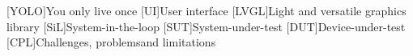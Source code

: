 \documentclass[Proposal,BIC,english,IEEE]{BASE/twbook} %
\begin{document}
\chapter*{\listacroname}
\begin{acronym}[XXXXX]
    [YOLO]{You only live once}
    [UI]{User interface}
    [LVGL]{Light and versatile graphics library}
    [SiL]{System-in-the-loop}
    [SUT]{System-under-test}
    [DUT]{Device-under-test}
    [CPL]{Challenges, problemsand limitations}
\end{acronym}
\clearpage
\clearpage
\end{document}
